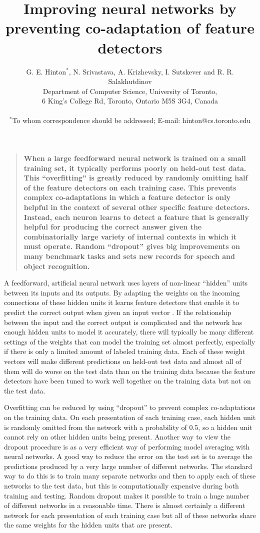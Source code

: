\documentclass[12pt]{article}
\title{Improving neural networks by preventing co-adaptation of feature detectors}
\author{G. E. Hinton$^\ast$, N. Srivastava, A. Krizhevsky, I. Sutskever and R. R.  Salakhutdinov\\
\normalsize{Department of Computer Science, University of Toronto,}\\
\normalsize{6 King's College Rd, Toronto, Ontario M5S 3G4, Canada}\\
\\
\normalsize{$^\ast$To whom correspondence should be addressed; E-mail:  hinton@cs.toronto.edu}
}
\date{}
\newenvironment{sciabstract}{%
\begin{quote} \bf}
{\end{quote}}
\begin{document}
 



\maketitle 

\begin{sciabstract}
When a large feedforward neural network is trained on a small training set, it typically
performs poorly on held-out test data.  This ``overfitting'' is greatly reduced by
randomly omitting half of the feature detectors on each training case. This prevents
complex co-adaptations in which a feature detector is only helpful in the context of
several other specific feature detectors.  Instead, each neuron learns to detect a feature
that is generally helpful for producing the correct answer given the combinatorially large
variety of internal contexts in which it must operate. Random ``dropout'' gives big
improvements on many benchmark tasks and sets new records for speech and object
recognition.
\end{sciabstract}

A feedforward, artificial neural network uses layers of non-linear ``hidden''
units between its inputs and its outputs. By adapting the weights on the incoming
connections of these hidden units it learns feature detectors that enable it to predict
the correct output when given an input vector \cite{RHW}.  If the relationship between the
input and the correct output is complicated and the network has enough hidden units to
model it accurately, there will typically be many different settings of the weights that
can model the training set almost perfectly, especially if there is only a limited amount of
labeled training data.  Each of these weight vectors will make different predictions on
held-out test data and almost all of them will do worse on the test data than on the training
data because the feature detectors have been tuned to work well together on the training
data but not on the test data. 

Overfitting can be reduced by using ``dropout'' to prevent complex co-adaptations on the
training data. On each presentation of each training case, each hidden unit is randomly
omitted from the network with a probability of 0.5, so a hidden unit cannot rely on other
hidden units being present. Another way to view the dropout procedure is as a very
efficient way of performing model averaging with neural networks. A good way to reduce the
error on the test set is to average the predictions produced by a very large number of
different networks.  The standard way to do this is to train many separate networks and
then to apply each of these networks to the test data, but this is computationally
expensive during both training and testing.  Random dropout makes it possible to train a
huge number of different networks in a reasonable time. There is almost certainly a
different network for each presentation of each training case but all of these networks
share the same weights for the hidden units that are present.
\end{document}
